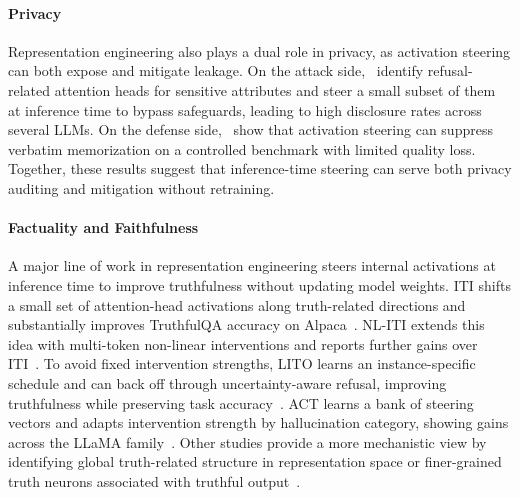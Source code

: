 \paragraph{Privacy}
Representation engineering also plays a dual role in privacy, as activation steering can both expose and mitigate leakage. On the attack side,~\citet{nakka2025piijailbreaking} identify refusal-related attention heads for sensitive attributes and steer a small subset of them at inference time to bypass safeguards, leading to high disclosure rates across several LLMs. On the defense side,~\citet{suri2025mitigatingmemorization} show that activation steering can suppress verbatim memorization on a controlled benchmark with limited quality loss. Together, these results suggest that inference-time steering can serve both privacy auditing and mitigation without retraining.


\paragraph{Factuality and Faithfulness}

A major line of work in representation engineering steers internal activations at inference time to improve truthfulness without updating model weights. ITI shifts a small set of attention-head activations along truth-related directions and substantially improves TruthfulQA accuracy on Alpaca~\citep{li2023iti}. NL-ITI extends this idea with multi-token non-linear interventions and reports further gains over ITI~\citep{hoscilowicz2024nliti}. To avoid fixed intervention strengths, LITO learns an instance-specific schedule and can back off through uncertainty-aware refusal, improving truthfulness while preserving task accuracy~\citep{bayat2024enhanced,bayat2024enhanced}. ACT learns a bank of steering vectors and adapts intervention strength by hallucination category, showing gains across the LLaMA family~\citep{wang2024act}. Other studies provide a more mechanistic view by identifying global truth-related structure in representation space or finer-grained truth neurons associated with truthful output~\citep{liu2024uth, li2025truthneurons}. 

